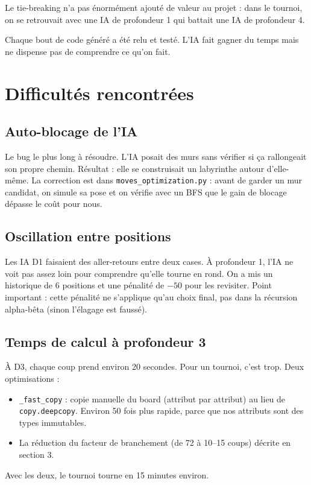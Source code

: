 \documentclass[a4paper, 12pt]{report}
\begin{document}
Le tie-breaking n'a pas énormément ajouté de valeur au projet : dans le tournoi, on se retrouvait avec une IA de profondeur 1 qui battait une IA de profondeur 4.

Chaque bout de code généré a été relu et testé. L'IA fait gagner du temps mais ne dispense pas de comprendre ce qu'on fait.

\section{Difficultés rencontrées}

\subsection{Auto-blocage de l'IA}

Le bug le plus long à résoudre. L'IA posait des murs sans vérifier si ça rallongeait son propre chemin. Résultat : elle se construisait un labyrinthe autour d'elle-même. La correction est dans \texttt{moves\_optimization.py} : avant de garder un mur candidat, on simule sa pose et on vérifie avec un BFS que le gain de blocage dépasse le coût pour nous.

\subsection{Oscillation entre positions}

Les IA D1 faisaient des aller-retours entre deux cases. À profondeur 1, l'IA ne voit pas assez loin pour comprendre qu'elle tourne en rond. On a mis un historique de 6 positions et une pénalité de $-50$ pour les revisiter. Point important : cette pénalité ne s'applique qu'au choix final, pas dans la récursion alpha-bêta (sinon l'élagage est faussé).

\subsection{Temps de calcul à profondeur 3}

À D3, chaque coup prend environ 20 secondes. Pour un tournoi, c'est trop. Deux optimisations :
\begin{itemize}
    \item \texttt{\_fast\_copy} : copie manuelle du board (attribut par attribut) au lieu de \texttt{copy.deepcopy}. Environ 50 fois plus rapide, parce que nos attributs sont des types immutables.
    \item La réduction du facteur de branchement (de 72 à 10--15 coups) décrite en section 3.
\end{itemize}
Avec les deux, le tournoi tourne en 15 minutes environ.
\end{document}
